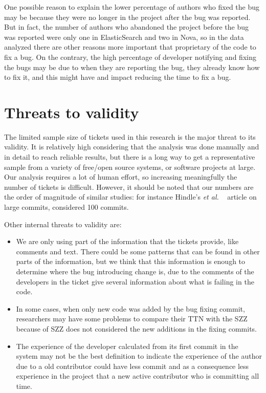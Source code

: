 \documentclass[10pt, conference]{IEEEtran}
\begin{document}
One possible reason to explain the lower percentage of authors who fixed the bug may be because they were no longer in the project after the bug was reported. But in fact, the number of authors who abandoned the project before the bug was reported were only one in ElasticSearch and two in Nova, so in the data analyzed there are other reasons more important that proprietary of the code to fix a bug. On the contrary, the high percentage of developer notifying and fixing the bugs may be due to when they are reporting the bug, they already know how to fix it, and this might have and impact reducing the time to fix a bug. 
 

\section{Threats to validity}
\label{sec:threats}
The limited sample size of tickets used in this research is the major threat to its validity. It is relatively high considering that the analysis was done manually and in detail to reach reliable results, but there is a long way to get a representative sample from a variety of free/open source systems, or software projects at large. Our analysis requires a lot of human effort, so increasing meaningfully the number of tickets is difficult. However, it should be noted that our numbers are the order of magnitude of similar studies: for instance Hindle's \emph{et al.} ~\cite{hindle2008large} article on large commits, considered 100 commits.

Other internal threats to validity are:

\begin{itemize}
    \item We are only using part of the information that the tickets provide, like comments and text. There could be some patterns that can be found in other parts of the information, but we think that this information is enough to determine where the bug introducing change is, due to the comments of the developers in the ticket give several information about what is failing in the code.
    \item In some cases, when only new code was added by the bug fixing commit, researchers may have some problems to compare their TTN with the SZZ because of SZZ does not considered the new additions in the fixing commits. 
    \item The experience of the developer calculated from its first commit in the system may not be the best definition to indicate the experience of the author due to a old contributor could have less commit and as a consequence less experience in the project that a new active contributor who is committing all time.
\end{itemize}
\end{document}
